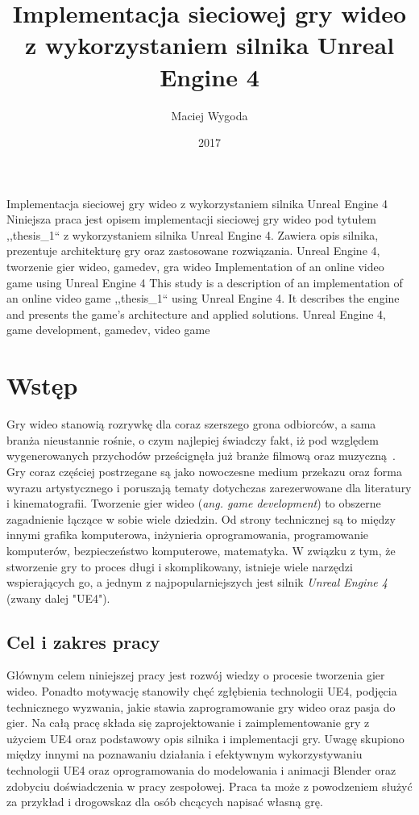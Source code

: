 \documentclass[multip]{SGGW-thesis}
\title{Implementacja sieciowej gry wideo z wykorzystaniem silnika Unreal Engine 4}
\author{Maciej Wygoda}
\date{2017}
\begin{document}
\maketitle
{}
\statementpage
\abstractpage
{Implementacja sieciowej gry wideo z wykorzystaniem silnika Unreal Engine 4}
{Niniejsza praca jest opisem implementacji sieciowej gry wideo pod tytułem ,,thesis\_1`` z wykorzystaniem silnika Unreal Engine 4. Zawiera opis silnika, prezentuje architekturę gry oraz zastosowane rozwiązania.}
{Unreal Engine 4, tworzenie gier wideo, gamedev, gra wideo}
{Implementation of an online video game using Unreal Engine 4}
{This study is a description of an implementation of an online video game ,,thesis\_1`` using Unreal Engine 4. It describes the engine and presents the game's architecture and applied solutions.}
{Unreal Engine 4, game development, gamedev, video game}

\tableofcontents

\chapter{Wstęp}
Gry wideo stanowią rozrywkę dla coraz szerszego grona odbiorców, a sama branża nieustannie rośnie, o czym najlepiej świadczy fakt, iż pod względem wygenerowanych przychodów prześcignęła już branże filmową oraz muzyczną~\cite{nasdaq-video-games-industry}. Gry coraz częściej postrzegane są jako nowoczesne medium przekazu oraz forma wyrazu artystycznego i poruszają tematy dotychczas zarezerwowane dla literatury i kinematografii. 
\newline Tworzenie gier wideo ({\em ang. game development}) to obszerne zagadnienie łączące w sobie wiele dziedzin. Od strony technicznej są to między innymi grafika komputerowa, inżynieria oprogramowania, programowanie komputerów, bezpieczeństwo komputerowe, matematyka. W związku z tym, że stworzenie gry to proces długi i skomplikowany, istnieje wiele narzędzi wspierających go, a jednym z najpopularniejszych jest silnik {\em Unreal Engine 4} (zwany dalej "UE4").
\section{Cel i zakres pracy}
Głównym celem niniejszej pracy jest rozwój wiedzy o procesie tworzenia gier wideo. Ponadto motywację stanowiły chęć zgłębienia technologii UE4, podjęcia technicznego wyzwania, jakie stawia zaprogramowanie gry wideo oraz pasja do gier. Na całą pracę składa się zaprojektowanie i zaimplementowanie gry z użyciem UE4 oraz podstawowy opis silnika i implementacji gry. 
\newline Uwagę skupiono między innymi na poznawaniu działania i efektywnym wykorzystywaniu technologii UE4 oraz oprogramowania do modelowania i animacji Blender oraz zdobyciu doświadczenia w pracy zespołowej.
\newline Praca ta może z powodzeniem służyć za przykład i drogowskaz dla osób chcących napisać własną grę.
\end{document}
